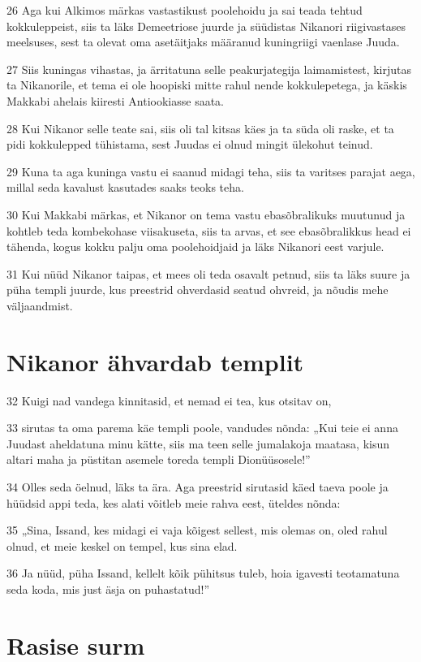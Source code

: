 \par 26 Aga kui Alkimos märkas vastastikust poolehoidu ja sai teada tehtud kokkuleppeist, siis ta läks Demeetriose juurde ja süüdistas Nikanori riigivastases meelsuses, sest ta olevat oma asetäitjaks määranud kuningriigi vaenlase Juuda.
\par 27 Siis kuningas vihastas, ja ärritatuna selle peakurjategija laimamistest, kirjutas ta Nikanorile, et tema ei ole hoopiski mitte rahul nende kokkulepetega, ja käskis Makkabi ahelais kiiresti Antiookiasse saata.
\par 28 Kui Nikanor selle teate sai, siis oli tal kitsas käes ja ta süda oli raske, et ta pidi kokkulepped tühistama, sest Juudas ei olnud mingit ülekohut teinud.
\par 29 Kuna ta aga kuninga vastu ei saanud midagi teha, siis ta varitses parajat aega, millal seda kavalust kasutades saaks teoks teha.
\par 30 Kui Makkabi märkas, et Nikanor on tema vastu ebasõbralikuks muutunud ja kohtleb teda kombekohase viisakuseta, siis ta arvas, et see ebasõbralikkus head ei tähenda, kogus kokku palju oma poolehoidjaid ja läks Nikanori eest varjule.
\par 31 Kui nüüd Nikanor taipas, et mees oli teda osavalt petnud, siis ta läks suure ja püha templi juurde, kus preestrid ohverdasid seatud ohvreid, ja nõudis mehe väljaandmist.
\section*{Nikanor ähvardab templit}

\par 32 Kuigi nad vandega kinnitasid, et nemad ei tea, kus otsitav on,
\par 33 sirutas ta oma parema käe templi poole, vandudes nõnda: „Kui teie ei anna Juudast aheldatuna minu kätte, siis ma teen selle jumalakoja maatasa, kisun altari maha ja püstitan asemele toreda templi Dionüüsosele!”
\par 34 Olles seda öelnud, läks ta ära. Aga preestrid sirutasid käed taeva poole ja hüüdsid appi teda, kes alati võitleb meie rahva eest, üteldes nõnda:
\par 35 „Sina, Issand, kes midagi ei vaja kõigest sellest, mis olemas on, oled rahul olnud, et meie keskel on tempel, kus sina elad.
\par 36 Ja nüüd, püha Issand, kellelt kõik pühitsus tuleb, hoia igavesti teotamatuna seda koda, mis just äsja on puhastatud!”


\section*{Rasise surm}

